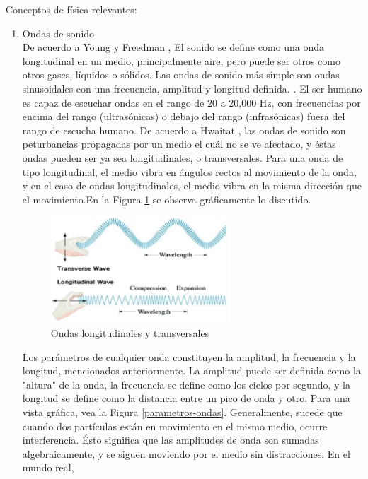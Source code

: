 \documentclass[12pt, letterpaper]{article}
\begin{document}
Conceptos de física relevantes:
\begin{enumerate}
    \item Ondas de sonido\\
    De acuerdo a Young y Freedman \cite{university-physics}, El sonido se define como una onda 
    longitudinal en un medio, principalmente aire, pero puede ser otros como otros gases, líquidos o sólidos. Las 
    ondas de sonido más simple son ondas sinusoidales con una frecuencia, amplitud y longitud definida. 
    \cite{university-physics}. El ser humano es capaz de escuchar ondas en el rango de 20 a 20,000 Hz, con 
    frecuencias por encima del rango (ultrasónicas) o debajo del rango (infrasónicas) fuera del rango de escucha humano. 
    De acuerdo a Hwaitat \cite{frequencies-wave-sound-pso}, las ondas de sonido son peturbancias propagadas por un medio el cuál 
    no se ve afectado, y éstas ondas pueden ser ya sea longitudinales, o transversales. Para una onda 
    de tipo longitudinal, el medio vibra en ángulos rectos al movimiento de la onda, y en el caso de ondas longitudinales, 
    el medio vibra en la misma dirección que el movimiento.En la Figura \ref*{Ondas Longitudinales} se observa gráficamente lo discutido. 
    \begin{figure}[H]
      \centering
      \includegraphics[height = 4cm]{ondas_longitudinales_transversales.png}
      \caption{Ondas longitudinales y transversales}
      \label{Ondas Longitudinales}
    \end{figure}
    Los parámetros de cualquier onda constituyen la amplitud, la frecuencia 
    y la longitud, mencionados anteriormente. La amplitud puede ser definida como la "altura" 
    de la onda, la frecuencia se define como los ciclos por segundo, y la longitud se define como la distancia 
    entre un pico de onda y otro. Para una vista gráfica, vea la Figura \ref*{parametros-ondas}. Generalmente, sucede que 
    cuando dos partículas están en movimiento en el mismo medio, ocurre interferencia. Ésto significa que 
    las amplitudes de onda son sumadas algebraicamente, y se siguen moviendo por el medio sin distracciones. En el mundo real, 

\end{enumerate}
\end{document}
